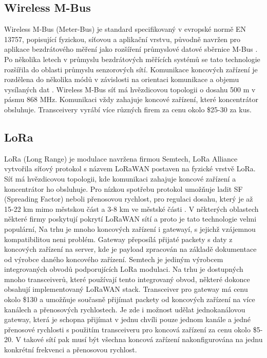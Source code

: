 \subsection{Wireless M-Bus}
Wireless M-Bus (Meter-Bus) je standard specifikovaný v evropské normě EN 13757, popisující fyzickou, síťovou a aplikační vrstvu, původně navržen pro aplikace bezdrátového měření jako rozšíření průmyslové datové sběrnice M-Bus \cite{wirelessMBus_automatizace}.
Po několika letech v průmyslu bezdrátových měřících systémů se tato technologie rozšířila do oblasti průmyslu senzorových sítí.
Komunikace koncových zařízení je rozdělena do několika módů v závislosti na orientaci komunikace a objemu vysílaných dat \cite{wirelessMBus01} \cite{wirelessMBus02}. 
Wireless M-Bus síť má hvězdicovou topologii o dosahu 500 m v pásmu 868 MHz.
Komunikaci vždy zahajuje koncové zařízení, které koncentrátor obsluhuje.
Transceivery vyrábí více různých firem za cenu okolo \$25-30 za kus.


\subsection{LoRa}
LoRa (Long Range) je modulace navržena firmou Semtech, LoRa Alliance vytvořila síťový protokol s názvem LoRaWAN postaven na fyzické vrstvě LoRa.
Síť má hvězdicovou topologii, kde komunikaci zahajuje koncové zařízení a koncentrátor ho obsluhuje.
Pro nízkou spotřebu protokol umožňuje ladit SF (Spreading Factor) neboli přenosovou rychlost, pro regulaci dosahu, který je až 15-22 km mimo městskou část a 3-8 km ve městské části \cite{lorawan_specification}.
V některých oblastech některé firmy poskytují pokrytí LoRaWAN sítí a proto je tato technologie velmi populární, Na trhu je mnoho koncových zařízení i gatewayí, s jejichž vzájemnou kompatibilitou neni problém. Gateway přeposílá přijaté packety s daty z koncových zařízení na server, kde je payload zpracován na základě dokumentace od výrobce daného koncového zařízení.
Semtech je jediným výrobcem integrovaných obvodů podporujících LoRa modulaci. Na trhu je dostupných mnoho transceiverů, které používají tento integrovaný obvod, některé dokonce obsahují implementovaný LoRaWAN stack.
Transceiver pro gateway má cenu okolo \$130 a umožňuje současně přijímat packety od koncových zařízení na více kanálech a přenosových rychlostech. Je zde i možnost udělat jednokanálovou gateway, která je schopna přijímat v jednu chvíli pouze jednom kanále a jedné přenosové rychlosti s použitím transceiveru pro koncová zařízení za cenu okolo \$5-20. V takové sítí pak musí být všechna koncová zařízení nakonfigurována na jednu konkrétní frekvenci a přenosovou rychlost.


